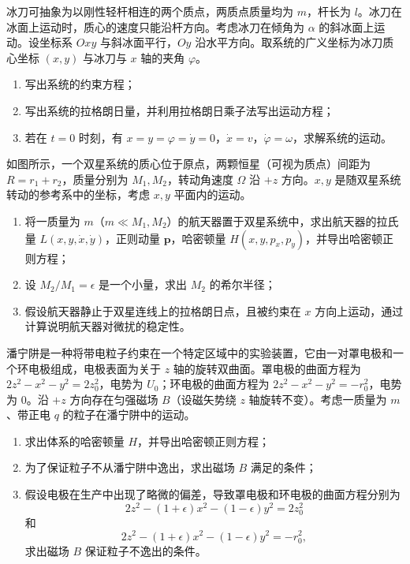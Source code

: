 \begin{question}[20 分]
冰刀可抽象为以刚性轻杆相连的两个质点，两质点质量均为 $m$，杆长为 $l$。冰刀在冰面上运动时，质心的速度只能沿杆方向。考虑冰刀在倾角为 $\alpha$ 的斜冰面上运动。设坐标系 $Oxy$ 与斜冰面平行，$Oy$ 沿水平方向。取系统的广义坐标为冰刀质心坐标 $(x,y)$ 与冰刀与 $x$ 轴的夹角 $\varphi$。
\begin{enumerate}
  \item 写出系统的约束方程；
  \item 写出系统的拉格朗日量，并利用拉格朗日乘子法写出运动方程；
  \item 若在 $t=0$ 时刻，有 $x=y=\varphi=\dot y=0$，$\dot x=v$，$\dot\varphi=\omega$，求解系统的运动。
\end{enumerate}

\begin{solution}
\end{solution}
\end{question}

\begin{question}[20 分]
如图所示，一个双星系统的质心位于原点，两颗恒星（可视为质点）间距为 $R=r_1+r_2$，质量分别为 $M_1,M_2$，转动角速度 $\Omega$ 沿 $+z$ 方向。$x,y$ 是随双星系统转动的参考系中的坐标，考虑 $x,y$ 平面内的运动。
\begin{enumerate}
  \item 将一质量为 $m$（$m\ll M_1,M_2$）的航天器置于双星系统中，求出航天器的拉氏量 $L(x,y,\dot x,\dot y)$，正则动量 $\boldsymbol p$，哈密顿量 $H(x,y,p_x,p_y)$，并导出哈密顿正则方程；
  \item 设 $M_2/M_1=\epsilon$ 是一个小量，求出 $M_2$ 的希尔半径；
  \item 假设航天器静止于双星连线上的拉格朗日点，且被约束在 $x$ 方向上运动，通过计算说明航天器对微扰的稳定性。
\end{enumerate}

\begin{solution}
\end{solution}
\end{question}

\begin{question}[20 分]
潘宁阱是一种将带电粒子约束在一个特定区域中的实验装置，它由一对罩电极和一个环电极组成，电极表面为关于 $z$ 轴的旋转双曲面。罩电极的曲面方程为 $2z^2-x^2-y^2=2z_0^2$，电势为 $U_0$；环电极的曲面方程为 $2z^2-x^2-y^2=-r_0^2$，电势为 $0$。沿 $+z$ 方向存在匀强磁场 $B$（设磁矢势绕 $z$ 轴旋转不变）。考虑一质量为 $m$、带正电 $q$ 的粒子在潘宁阱中的运动。
\begin{enumerate}
  \item 求出体系的哈密顿量 $H$，并导出哈密顿正则方程；
  \item 为了保证粒子不从潘宁阱中逸出，求出磁场 $B$ 满足的条件；
  \item 假设电极在生产中出现了略微的偏差，导致罩电极和环电极的曲面方程分别为
  \[
    2z^2-(1+\epsilon)x^2-(1-\epsilon)y^2=2z_0^2
  \]
  和
  \[
    2z^2-(1+\epsilon)x^2-(1-\epsilon)y^2=-r_0^2,
  \]
  求出磁场 $B$ 保证粒子不逸出的条件。
\end{enumerate}

\begin{solution}
\end{solution}
\end{question}
